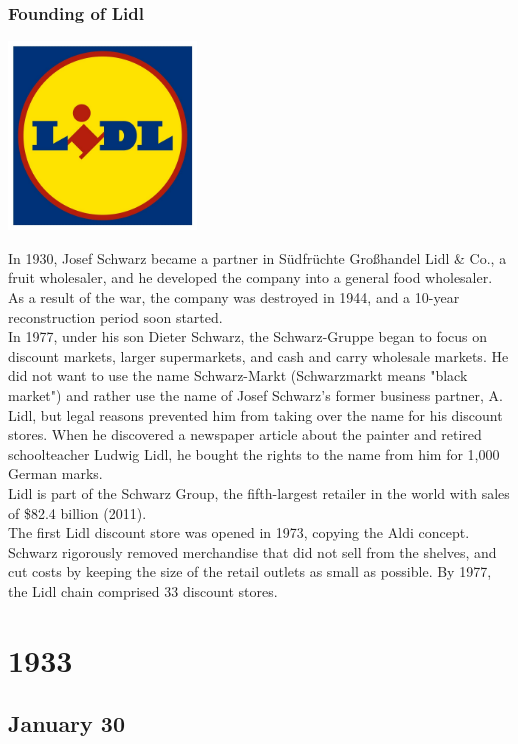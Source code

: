 \documentclass[11pt]{report}
\begin{document}
\subsection{Founding of Lidl}
\vspace{2mm}\begin{center}\includegraphics[width=5cm]{./img/lidlLogo.jpg}\end{center}
In 1930, Josef Schwarz became a partner in Südfrüchte Großhandel Lidl \& Co., a fruit wholesaler, and he developed the company into a general food wholesaler. As a result of the war, the company was destroyed in 1944, and a 10-year reconstruction period soon started.\\
\indent In 1977, under his son Dieter Schwarz, the Schwarz-Gruppe began to focus on discount markets, larger supermarkets, and cash and carry wholesale markets. He did not want to use the name Schwarz-Markt (Schwarzmarkt means "black market") and rather use the name of Josef Schwarz's former business partner, A. Lidl, but legal reasons prevented him from taking over the name for his discount stores. When he discovered a newspaper article about the painter and retired schoolteacher Ludwig Lidl, he bought the rights to the name from him for 1,000 German marks.\\
\indent Lidl is part of the Schwarz Group, the fifth-largest retailer in the world with sales of \$82.4 billion (2011).\\ \indent The first Lidl discount store was opened in 1973, copying the Aldi concept. Schwarz rigorously removed merchandise that did not sell from the shelves, and cut costs by keeping the size of the retail outlets as small as possible. By 1977, the Lidl chain comprised 33 discount stores.

\chapter{1933}
\section{January 30}
\end{document}
